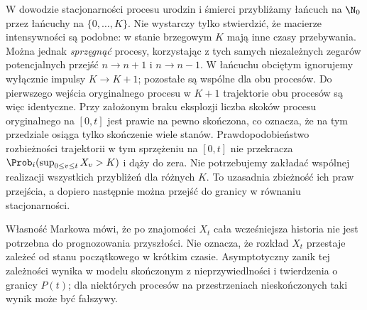 \begin{uwaga}
W dowodzie stacjonarności procesu urodzin i śmierci
przybliżamy łańcuch na $\N_0$ przez łańcuchy na
$\{0,\ldots,K\}$. Nie wystarczy tylko stwierdzić, że
macierze intensywności są podobne: w stanie brzegowym $K$
mają inne czasy przebywania. Można jednak \emph{sprzęgnąć}
procesy, korzystając z tych samych niezależnych zegarów
potencjalnych przejść $n\to n+1$ i $n\to n-1$.
W łańcuchu obciętym ignorujemy wyłącznie impulsy
$K\to K+1$; pozostałe są wspólne dla obu procesów.
Do pierwszego wejścia oryginalnego procesu w $K+1$
trajektorie obu procesów są więc identyczne.
Przy założonym braku eksplozji liczba skoków procesu
oryginalnego na $[0,t]$ jest prawie na pewno skończona,
co oznacza, że na tym przedziale osiąga tylko skończenie
wiele stanów. Prawdopodobieństwo rozbieżności trajektorii w tym
sprzężeniu na $[0,t]$ nie przekracza
$\Prob_i(\sup_{0\le v\le t}X_v>K)$ i dąży do zera.
Nie potrzebujemy zakładać wspólnej realizacji wszystkich
przybliżeń dla różnych $K$.
To uzasadnia zbieżność ich praw przejścia, a dopiero
następnie można przejść do granicy w równaniu stacjonarności.
\end{uwaga}

\begin{uwaga}
Własność Markowa mówi, że po znajomości $X_t$ cała
wcześniejsza historia nie jest potrzebna do prognozowania
przyszłości. Nie oznacza, że rozkład $X_t$ przestaje
zależeć od stanu początkowego w krótkim czasie.
Asymptotyczny zanik tej zależności wynika w modelu
skończonym z nieprzywiedlności i twierdzenia o granicy
$P(t)$; dla niektórych procesów na przestrzeniach
nieskończonych taki wynik może być fałszywy.
\end{uwaga}

